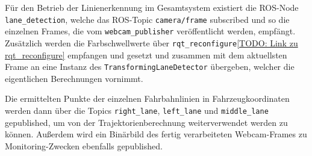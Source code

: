 F\"ur den Betrieb der Linienerkennung im Gesamtsystem existiert die ROS-Node \texttt{lane\_detection},
welche das ROS-Topic \texttt{camera/frame} subscribed und so die einzelnen Frames, die vom
\texttt{webcam\_publisher} ver\"offentlicht werden, empf\"angt. Zus\"atzlich werden die Farbschwellwerte
\"uber \texttt{rqt\_reconfigure}\ref{TODO: Link zu rqt_reconfigure} empfangen und gesetzt und zusammen mit
dem aktuellsten Frame an eine Instanz des \texttt{TransformingLaneDetector} \"ubergeben, welcher die
eigentlichen Berechnungen vornimmt.

Die ermittelten Punkte der einzelnen Fahrbahnlinien in Fahrzeugkoordinaten werden dann \"uber die Topics
\texttt{right\_lane}, \texttt{left\_lane} und \texttt{middle\_lane} gepublished, um von der
Trajektorienberechnung weiterverwendet werden zu k\"onnen. Au\ss erdem wird ein Bin\"arbild des fertig
verarbeiteten Webcam-Frames zu Monitoring-Zwecken ebenfalls gepublished.